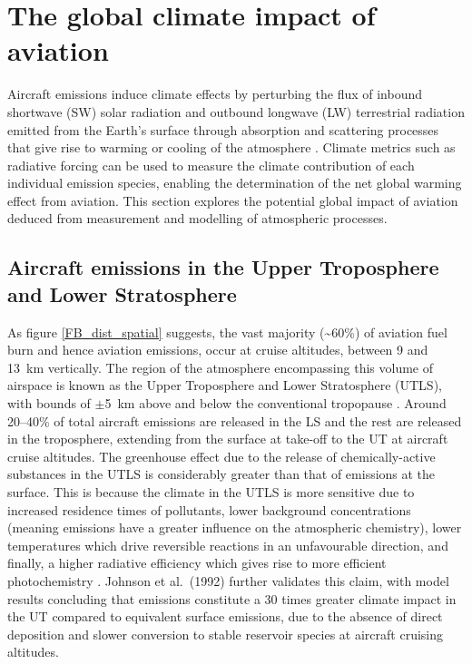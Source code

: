 \section{The global climate impact of aviation}
\label{climate}
Aircraft emissions induce climate effects by perturbing the flux of inbound shortwave (SW) solar radiation and outbound longwave (LW) terrestrial radiation emitted from the Earth's surface through absorption and scattering processes that give rise to warming or cooling of the atmosphere \cite{Myhre2013}. Climate metrics such as radiative forcing can be used to measure the climate contribution of each individual emission species, enabling the determination of the net global warming effect from aviation. This section explores the potential global impact of aviation deduced from measurement and modelling of atmospheric processes.


\subsection{Aircraft emissions in the Upper Troposphere and Lower Stratosphere}
As figure \ref{FB_dist_spatial} suggests, the vast majority (\textasciitilde60\%) of aviation fuel burn and hence aviation emissions, occur at cruise altitudes, between 9 and 13~km vertically. The region of the atmosphere encompassing this volume of airspace is known as the Upper Troposphere and Lower Stratosphere (UTLS), with bounds of $\pm$5~km above and below the conventional tropopause \cite{Gettelman2011}. Around 20--40\% of total aircraft emissions are released in the LS \cite{IPCC1999, Hoinka1993} and the rest are released in the troposphere, extending from the surface at take-off to the UT at aircraft cruise altitudes. The greenhouse effect due to the release of chemically-active substances in the UTLS is considerably greater than that of emissions at the surface. This is because the climate in the UTLS is more sensitive due to increased residence times of pollutants, lower background concentrations (meaning emissions have a greater influence on the atmospheric chemistry), lower temperatures which drive reversible reactions in an unfavourable direction, and finally, a higher radiative efficiency which gives rise to more efficient photochemistry \cite{Schumann1997}. Johnson et al.\ (1992) \cite{Johnson1992} further validates this claim, with model results concluding that  emissions constitute a 30 times greater climate impact in the UT compared to equivalent surface emissions, due to the absence of direct deposition and slower conversion to stable reservoir species at aircraft cruising altitudes.

